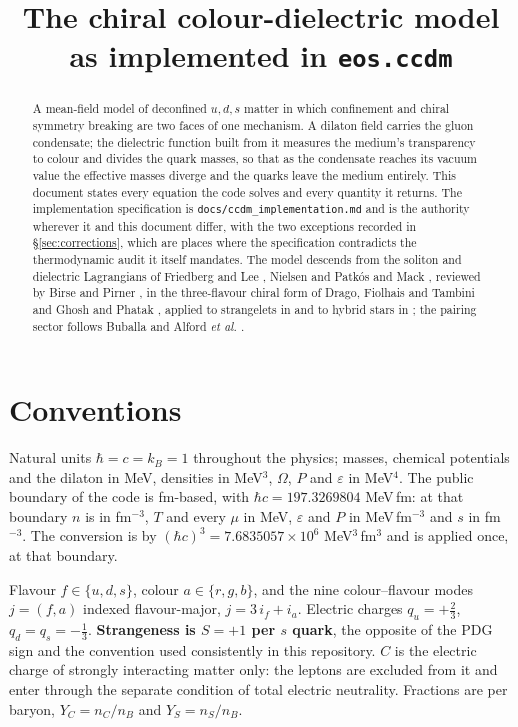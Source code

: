 \documentclass[11pt,a4paper]{article}
\title{The chiral colour-dielectric model \\
\large as implemented in \texttt{eos.ccdm}}
\author{}
\date{}
\newcommand{\code}[1]{\texttt{#1}}
\begin{document}
\maketitle

\begin{abstract}
A mean-field model of deconfined $u,d,s$ matter in which confinement and
chiral symmetry breaking are two faces of one mechanism. A dilaton field
carries the gluon condensate; the dielectric function built from it measures
the medium's transparency to colour and divides the quark masses, so that as
the condensate reaches its vacuum value the effective masses diverge and the
quarks leave the medium entirely. This document states every equation the code
solves and every quantity it returns. The implementation specification is
\code{docs/ccdm\_implementation.md} and is the authority wherever it and this
document differ, with the two exceptions recorded in \S\ref{sec:corrections},
which are places where the specification contradicts the thermodynamic audit
it itself mandates. The model descends from the soliton and dielectric
Lagrangians of Friedberg and Lee \cite{FriedbergLee1977,FriedbergLee1978},
Nielsen and Patk\'os \cite{NielsenPatkos1982} and Mack \cite{Mack1984},
reviewed by Birse \cite{Birse1990} and Pirner \cite{Pirner1992}, in the
three-flavour chiral form of Drago, Fiolhais and Tambini
\cite{DragoFiolhaisTambini1996} and Ghosh and Phatak \cite{GhoshPhatak1995},
applied to strangelets in \cite{AlbericoDragoRatti2002} and to hybrid stars in
\cite{Maieron2004};
the pairing sector follows Buballa \cite{Buballa2005} and Alford
\emph{et al.} \cite{Alford2008}.
\end{abstract}

\tableofcontents

\section{Conventions}

Natural units $\hbar=c=k_B=1$ throughout the physics; masses, chemical
potentials and the dilaton in MeV, densities in MeV$^3$, $\Omega$, $P$ and
$\varepsilon$ in MeV$^4$. The public boundary of the code is fm-based, with
$\hbar c = 197.3269804$ MeV\,fm: at that boundary $n$ is in fm$^{-3}$, $T$ and
every $\mu$ in MeV, $\varepsilon$ and $P$ in MeV\,fm$^{-3}$ and $s$ in
fm$^{-3}$. The conversion is by $(\hbar c)^3 = 7.6835057\times10^{6}$
MeV$^3$\,fm$^3$ and is applied once, at that boundary.

Flavour $f\in\{u,d,s\}$, colour $a\in\{r,g,b\}$, and the nine colour--flavour
modes $j=(f,a)$ indexed flavour-major, $j = 3\,i_f + i_a$. Electric charges
$q_u=+\tfrac23$, $q_d=q_s=-\tfrac13$. \textbf{Strangeness is $S=+1$ per $s$
quark}, the opposite of the PDG sign and the convention used consistently in
this repository. $C$ is the electric charge of strongly interacting matter
only: the leptons are excluded from it and enter through the separate
condition of total electric neutrality. Fractions are per baryon,
$Y_C=n_C/n_B$ and $Y_S=n_S/n_B$.
\end{document}
